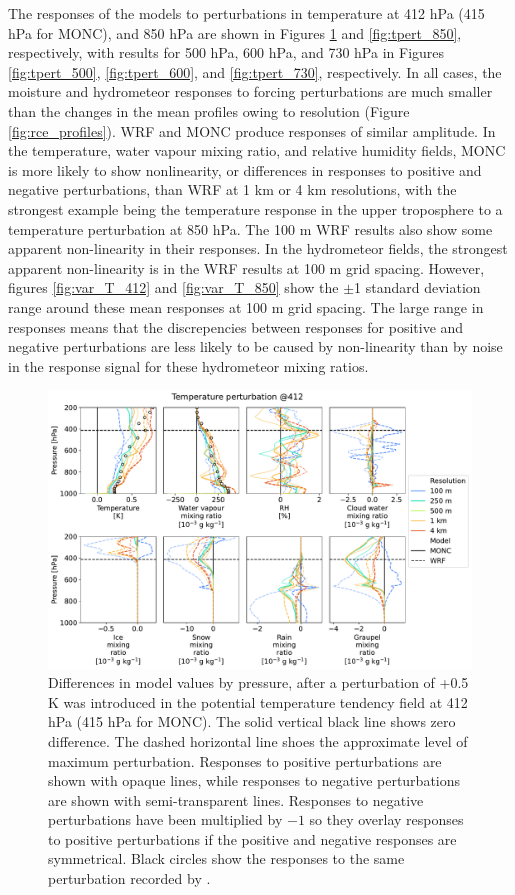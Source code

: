 \documentclass[draft]{agujournal2019}
\begin{document}
The responses of the models to perturbations in temperature at 412 hPa (415 hPa
for MONC), and 850 hPa are shown in Figures \ref{fig:tpert_412} and
\ref{fig:tpert_850}, respectively, with results for 500 hPa, 600 hPa, and 730
hPa in Figures \ref{fig:tpert_500}, \ref{fig:tpert_600}, and
\ref{fig:tpert_730}, respectively. In all cases, the moisture and hydrometeor
responses to forcing perturbations are much smaller than the changes in the mean
profiles owing to resolution (Figure \ref{fig:rce_profiles}). WRF and MONC
produce responses of similar amplitude. In the temperature, water vapour mixing
ratio, and relative humidity fields, MONC is more likely to show nonlinearity,
or differences in responses to positive and negative perturbations, than WRF at
1 km or 4 km resolutions, with the strongest example being the temperature
response in the upper troposphere to a temperature perturbation at 850 hPa. The
100 m WRF results also show some apparent non-linearity in their responses. In
the hydrometeor fields, the strongest apparent non-linearity is in the WRF
results at 100 m grid spacing. However, figures \ref{fig:var_T_412} and
\ref{fig:var_T_850} show the $\pm$1 standard deviation range around these mean
responses at 100 m grid spacing. The large range in responses means that the
discrepencies between responses for positive and negative perturbations are less
likely to be caused by non-linearity than by noise in the response signal for
these hydrometeor mixing ratios.

\begin{figure}[pth]
    \noindent\includegraphics[width=\textwidth]{figures/pert_diffs_T_0.5_@412}
    \caption{Differences in model values by pressure, after a perturbation of
    +0.5 K was introduced in the potential temperature tendency field at 412 hPa
    (415 hPa for MONC). The solid vertical black line shows zero difference. The
    dashed horizontal line shoes the approximate level of maximum perturbation.
    Responses to positive perturbations are shown with opaque lines, while
    responses to negative perturbations are shown with semi-transparent lines.
    Responses to negative perturbations have been multiplied by $-1$ so they
    overlay responses to positive perturbations if the positive and negative
    responses are symmetrical. Black circles show the responses to the same
    perturbation recorded by .}
    \label{fig:tpert_412}
\end{figure}
\end{document}
